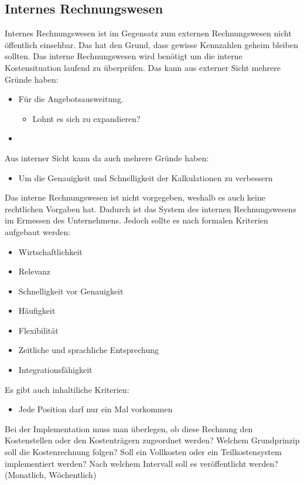 \documentclass{article}
\begin{document}
	\subsection{Internes Rechnungswesen}
	Internes Rechnungswesen ist im Gegensatz zum externen Rechnungswesen nicht öffentlich einsehbar. Das hat den Grund, dass gewisse Kennzahlen geheim bleiben sollten. Das interne Rechnungswesen wird benötigt um die interne Kostensituation laufend zu überprüfen. Das kann aus externer Sicht mehrere Gründe haben:
	\begin{itemize}
		\item{Für die Angebotsausweitung.}
		\begin{itemize}
			\item{Lohnt es sich zu expandieren?}
		\end{itemize}
		\item{}
	\end{itemize}
	Aus interner Sicht kann da auch mehrere Gründe haben:
	\begin{itemize}
		\item{Um die Genauigkeit und Schnelligkeit der Kalkulationen zu verbessern}
	\end{itemize}
	Das interne Rechnungswesen ist nicht vorgegeben, weshalb es auch keine rechtlichen Vorgaben hat. Dadurch ist das System des internen Rechnungswesens im Ermessen des Unternehmens. Jedoch sollte es nach formalen Kriterien aufgebaut werden:
	\begin{itemize}
		\item{Wirtschaftlichkeit}
		\item{Relevanz}
		\item{Schnelligkeit vor Genauigkeit}
		\item{Häufigkeit}
		\item{Flexibilität}
		\item{Zeitliche und sprachliche Entsprechung}
		\item{Integrationsfähigkeit}
	\end{itemize}
	Es gibt auch inhaltiliche Kriterien:
	\begin{itemize}
		\item{Jede Position darf nur ein Mal vorkommen}
	\end{itemize}
	Bei der Implementation muss man überlegen, ob diese Rechnung den Kostenstellen oder den Kostenträgern zugeordnet werden?
	Welchem Grundprinzip soll die Kostenrechnung folgen?
	Soll ein Vollkosten oder ein Teilkostensystem implementiert werden?
	Nach welchem Intervall soll es veröffentlicht werden? (Monatlich, Wöchentlich)
\end{document}
